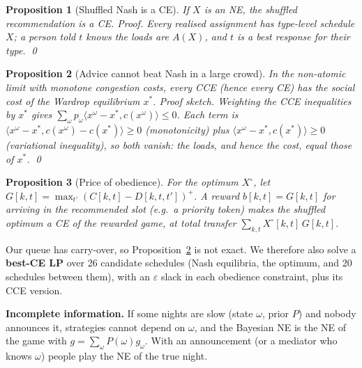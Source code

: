 \documentclass{article}
\newtheorem{proposition}{Proposition}
\begin{document}
\begin{proposition}[Shuffled Nash is a CE]\label{p1} If $X$ is an NE, the shuffled recommendation is a CE.
\emph{Proof.} Every realised assignment has type-level schedule $X$; a person told $t$ knows the loads are $A(X)$, and
$t$ is a best response for their type. \qed\end{proposition}
\begin{proposition}[Advice cannot beat Nash in a large crowd]\label{p2} In the non-atomic limit with monotone
congestion costs, every CCE (hence every CE) has the social cost of the Wardrop equilibrium $x^*$.
\emph{Proof sketch.} Weighting the CCE inequalities by $x^*$ gives $\sum_\omega p_\omega\langle x^\omega-x^*,
c(x^\omega)\rangle\le0$. Each term is $\langle x^\omega-x^*,c(x^\omega)-c(x^*)\rangle\ge0$ (monotonicity) plus
$\langle x^\omega-x^*,c(x^*)\rangle\ge0$ (variational inequality), so both vanish: the loads, and hence the cost,
equal those of $x^*$. \qed\end{proposition}
\begin{proposition}[Price of obedience]\label{p3} For the optimum $X^\circ$, let
$G[k,t]=\max_{t'}(C[k,t]-D[k,t,t'])^+$. A reward $b[k,t]=G[k,t]$ for arriving in the recommended slot (e.g.\ a
priority token) makes the shuffled optimum a CE of the rewarded game, at total transfer
$\sum_{k,t}X^\circ[k,t]\,G[k,t]$.\end{proposition}
Our queue has carry-over, so Proposition~\ref{p2} is not exact. We therefore also solve a \textbf{best-CE LP} over
26 candidate schedules (Nash equilibria, the optimum, and 20 schedules between them), with an $\varepsilon$ slack in
each obedience constraint, plus its CCE version.

\textbf{Incomplete information.} If some nights are slow (state $\omega$, prior $P$) and nobody announces it,
strategies cannot depend on $\omega$, and the Bayesian NE is the NE of the game with $g=\sum_\omega P(\omega)g_\omega$.
With an announcement (or a mediator who knows $\omega$) people play the NE of the true night.
\end{document}
